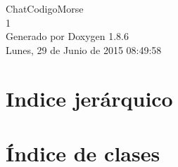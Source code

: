 \documentclass[twoside]{book}
\newcommand{\clearemptydoublepage}{%
  \newpage{\pagestyle{empty}\cleardoublepage}%
}
\begin{document}
\hypersetup{pageanchor=false}
\begin{titlepage}
\vspace*{7cm}
\begin{center}%
{\Large Chat\-Codigo\-Morse \\[1ex]\large 1 }\\
\vspace*{1cm}
{\large Generado por Doxygen 1.8.6}\\
\vspace*{0.5cm}
{\small Lunes, 29 de Junio de 2015 08:49:58}\\
\end{center}
\end{titlepage}
\clearemptydoublepage
\tableofcontents
\clearemptydoublepage
{}
\hypersetup{pageanchor=true}

\chapter{Indice jerárquico}

\chapter{Índice de clases}

\end{document}
